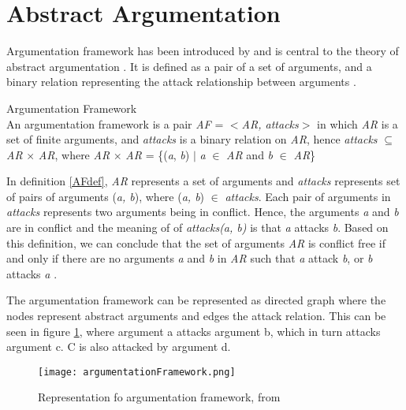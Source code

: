\section{Abstract Argumentation}
Argumentation framework has been introduced by \citet{dung1995} and is central to the theory of abstract argumentation \citep{baroni2011introduction}. It is defined as a pair of a set of arguments, and a binary relation representing the attack relationship between arguments \citep{dung1995}. 

\theoremstyle{definition}
\begin{definition}{Argumentation Framework}
\label{AFdef}\\
An argumentation framework is a pair \textit{AF} = $<$\textit{AR, attacks}$>$ in which \textit{AR} is a set of finite arguments, and \textit{attacks} is a binary relation on \textit{AR}, hence \textit{attacks} $\subseteq$ \textit{AR} $\times$ \textit{AR}, where \textit{AR} $\times$ \textit{AR} = \{(\textit{a}, \textit{b}) $\vert$ \textit{a} $\in$ \textit{AR} and \textit{b} $\in$ \textit{AR}\}
\end{definition}

In definition \ref{AFdef}, \textit{AR} represents a set of arguments and \textit{attacks} represents set of pairs of arguments (\textit{a, b}), where (\textit{a, b}) $\in$ \textit{attacks}. Each pair of arguments in \textit{attacks} represents two arguments being in conflict. Hence, the arguments \textit{a} and \textit{b} are in conflict and the meaning of of \textit{attacks(a, b)} is that \textit{a} attacks \textit{b}. Based on this definition, we can conclude that the set of arguments \textit{AR} is conflict free if and only if there are no arguments \textit{a} and \textit{b} in \textit{AR} such that \textit{a} attack \textit{b}, or \textit{b} attacks \textit{a} \citep{dung1995}.

The argumentation framework can be represented as directed graph where the nodes represent abstract arguments and edges the attack relation. This can be seen in figure \ref{fig:argumentationFrameworkFigure}, where argument a attacks argument b, which in turn attacks argument c. C is also attacked by argument d.

\begin{figure}[h]
	\centering
	\texttt{[image: argumentationFramework.png]}
	\caption{Representation fo argumentation framework, from \citep{argumentationFrameworkExample}}
	\label{fig:argumentationFrameworkFigure}
\end{figure}
 
